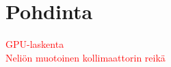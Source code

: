 \section{Pohdinta}
\textcolor{red}{GPU-laskenta}\\
\textcolor{red}{Neliön muotoinen kollimaattorin reikä}